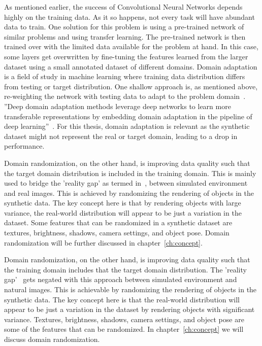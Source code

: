 As mentioned earlier, the success of Convolutional Neural Networks depends highly on the training data.
As it so happens, not every task will have abundant data to train.
One solution for this problem is using a pre-trained network of similar problems and using transfer learning.
The pre-trained network is then trained over with the limited data available for the problem at hand.
In this case, some layers get overwritten by fine-tuning the features learned from the larger dataset using a small annotated dataset of different domains.
Domain adaptation is a field of study in machine learning where training data distribution differs from testing or target distribution.
One shallow approach is, as mentioned above,
re-weighting the network with testing data to adapt to the problem domain~\cite{Li2017PredictionRF}.
”Deep domain adaptation methods leverage deep networks to learn more transferable representations by embedding domain adaptation in the pipeline of
deep learning”~\cite{DBLP:journals/corr/abs-1802-03601}.
For this thesis, domain adaptation is relevant as the synthetic dataset might not represent the real or target domain, leading to a drop in performance.

Domain randomization, on the other hand, is improving data quality such that the target domain distribution is included in the training domain.
This is mainly used to bridge the 'reality gap' as termed in~\cite{tobin2017domain}, between simulated environment and real images.
This is achieved by randomizing the rendering of objects in the synthetic data.
The key concept here is that by rendering objects with large variance, the real-world distribution will appear to be just a variation in the dataset.
Some features that can be randomized in a synthetic dataset are textures, brightness, shadows, camera settings, and object pose.
Domain randomization will be further discussed in chapter~\ref{ch:concept}.

Domain randomization, on the other hand, is improving data quality such that the training domain includes that the target domain distribution.
The ’reality gap’~\cite{tobin2017domain} gets negated with this approach between simulated environment and natural images.
This is achievable by randomizing the rendering of objects in the synthetic data.
The key concept here is that the real-world distribution will appear to be just a variation in the dataset by rendering objects with significant variance.
Textures, brightness, shadows, camera settings, and object pose are some of the features that can be randomized.
In chapter~\ref{ch:concept} we will discuss domain randomization.


